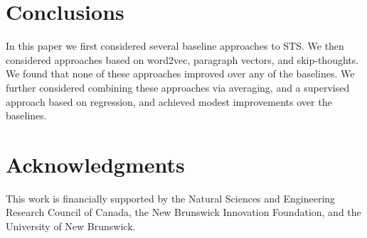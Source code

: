 \documentclass[11pt,letterpaper]{article}
\begin{document}





\section{Conclusions}

In this paper we first considered several baseline approaches to
STS. We then considered approaches based on word2vec, paragraph
vectors, and skip-thoughts. We found that none of these approaches
improved over any of the baselines. We further considered combining
these approaches via averaging, and a supervised approach based on
regression, and achieved modest improvements over the baselines.

\section*{Acknowledgments}
This work is financially supported by the Natural Sciences and
Engineering Research Council of Canada, the New Brunswick Innovation
Foundation, and the University of New Brunswick.



\end{document}
